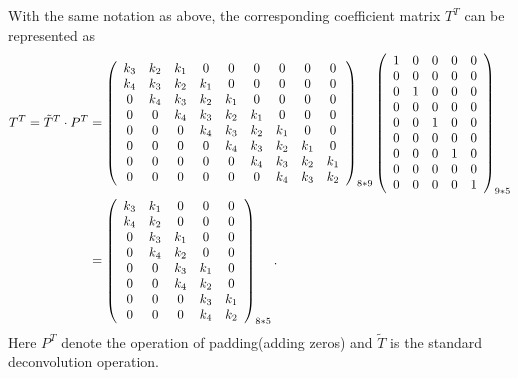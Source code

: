 With the same notation as above, the corresponding coefficient matrix $T^T$ can be represented as 
\begin{align}
   T^T = \tilde{T}^T\cdot  P^T &= 
\left(
  \begin{array}{ccccccccc}
     k_3 & k_2 & k_1 & 0 & 0 & 0 & 0 & 0  & 0\\
     k_4 & k_3 & k_2 & k_1 & 0 & 0 & 0 &  0 & 0\\
     0 & k_4 & k_3 & k_2 & k_1 & 0 & 0 & 0 & 0\\
     0 & 0 & k_4 & k_3 & k_2 & k_1 & 0 & 0  & 0\\
     0 & 0 & 0 & k_4 & k_3 & k_2 & k_1 & 0  & 0\\
     0 & 0 & 0 & 0 & k_4 & k_3 & k_2 & k_1  & 0\\
     0 & 0 & 0 & 0 & 0 & k_4 & k_3 & k_2 & k_1  \\
     0 & 0 & 0 & 0 & 0 & 0  & k_4 & k_3 & k_2   \\
  \end{array}
\right)_{8*9}
\left(
  \begin{array}{ccccc}
     1 & 0 & 0 & 0 & 0  \\
     0 & 0 & 0 & 0 & 0  \\
     0 & 1 & 0 & 0 & 0  \\
     0 & 0 & 0 & 0 & 0  \\
     0 & 0 & 1 & 0 & 0  \\
     0 & 0 & 0 & 0 & 0  \\
     0 & 0 & 0 & 1 & 0  \\
     0 & 0 & 0 & 0 & 0  \\
     0 & 0 & 0 & 0 & 1  \\
  \end{array}
\right)_{9*5}
\\ \notag 
&= 
\left(
  \begin{array}{ccccc}
     k_3 & k_1 & 0 & 0 & 0   \\
     k_4 & k_2 & 0 & 0 & 0   \\
     0 & k_3 & k_1 & 0 & 0  \\     
     0 & k_4 & k_2 & 0 & 0  \\
     0 & 0 & k_3 & k_1 & 0  \\
     0 & 0 & k_4 & k_2 & 0  \\
     0 & 0 & 0 & k_3 & k_1  \\
     0 & 0 & 0 & k_4 & k_2  \\
  \end{array}
\right)_{8*5}.
\end{align}
Here $P^T$ denote the operation of padding(adding zeros) and $\tilde{T}$ is the standard deconvolution operation.

